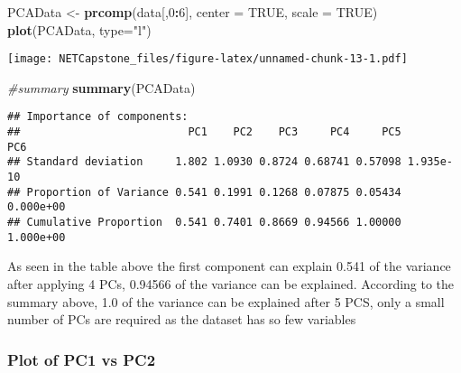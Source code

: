 \documentclass[
]{article}
\newenvironment{Shaded}{\begin{snugshade}}{\end{snugshade}}
\newcommand{\CommentTok}[1]{\textcolor[rgb]{0.56,0.35,0.01}{\textit{#1}}}
\newcommand{\DataTypeTok}[1]{\textcolor[rgb]{0.13,0.29,0.53}{#1}}
\newcommand{\DecValTok}[1]{\textcolor[rgb]{0.00,0.00,0.81}{#1}}
\newcommand{\FloatTok}[1]{\textcolor[rgb]{0.00,0.00,0.81}{#1}}
\newcommand{\KeywordTok}[1]{\textcolor[rgb]{0.13,0.29,0.53}{\textbf{#1}}}
\newcommand{\NormalTok}[1]{#1}
\newcommand{\OperatorTok}[1]{\textcolor[rgb]{0.81,0.36,0.00}{\textbf{#1}}}
\newcommand{\OtherTok}[1]{\textcolor[rgb]{0.56,0.35,0.01}{#1}}
\newcommand{\StringTok}[1]{\textcolor[rgb]{0.31,0.60,0.02}{#1}}
\begin{document}
\begin{Shaded}
\begin{Highlighting}[]
\NormalTok{PCAData <-}\StringTok{ }\KeywordTok{prcomp}\NormalTok{(data[,}\DecValTok{0}\OperatorTok{:}\DecValTok{6}\NormalTok{], }\DataTypeTok{center =} \OtherTok{TRUE}\NormalTok{, }\DataTypeTok{scale =} \OtherTok{TRUE}\NormalTok{)}
\KeywordTok{plot}\NormalTok{(PCAData, }\DataTypeTok{type=}\StringTok{"l"}\NormalTok{)}
\end{Highlighting}
\end{Shaded}

\texttt{[image: NETCapstone\_files/figure-latex/unnamed-chunk-13-1.pdf]}

\begin{Shaded}
\begin{Highlighting}[]
\CommentTok{#summary}
\KeywordTok{summary}\NormalTok{(PCAData)}
\end{Highlighting}
\end{Shaded}

\begin{verbatim}
## Importance of components:
##                          PC1    PC2    PC3     PC4     PC5       PC6
## Standard deviation     1.802 1.0930 0.8724 0.68741 0.57098 1.935e-10
## Proportion of Variance 0.541 0.1991 0.1268 0.07875 0.05434 0.000e+00
## Cumulative Proportion  0.541 0.7401 0.8669 0.94566 1.00000 1.000e+00
\end{verbatim}

As seen in the table above the first component can explain 0.541 of the
variance after applying 4 PCs, 0.94566 of the variance can be explained.
According to the summary above, 1.0 of the variance can be explained
after 5 PCS, only a small number of PCs are required as the dataset has
so few variables

\hypertarget{plot-of-pc1-vs-pc2}{%
\subsubsection{Plot of PC1 vs PC2}\label{plot-of-pc1-vs-pc2}}

\begin{Shaded}
\end{Shaded}
\end{document}
